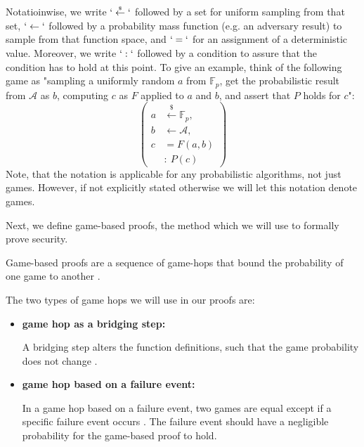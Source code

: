Notatioinwise, we write $`\overset{{\scriptscriptstyle\$}}{\leftarrow}`$ followed by a set for uniform sampling from that set, $`\leftarrow`$ followed by a probability mass function (e.g. an adversary result) to sample from that function space, and $`=`$ for an assignment of a deterministic value. Moreover, we write $`:`$ followed by a condition to assure that the condition has to hold at this point. To give an example, think of the following game as "sampling a uniformly random $a$ from $\mathbb{F}_p$, get the probabilistic result from $\mathcal{A}$ as $b$, computing $c$ as $F$ applied to $a$ and $b$, and assert that $P$ holds for $c$":
\begin{equation*}
    \left(
    \begin{aligned}
        a & \overset{{\scriptscriptstyle\$}}{\leftarrow} \mathbb{F}_p, \\
        b & \leftarrow \mathcal{A}, \\
        c & = F(a,b) \\
        & : \ P(c)
    \end{aligned}
    \right)
\end{equation*}
Note, that the notation is applicable for any probabilistic algorithms, not just games. However, if not explicitly stated otherwise we will let this notation denote games.

Next, we define game-based proofs, the method which we will use to formally prove security.

\begin{definition}
    \label{game-hops-def}
    Game-based proofs are a sequence of game-hops that bound the probability of one game to another \parencite{gamesB&R,shoup_games}.

    The two types of game hops we will use in our proofs are:
    \begin{itemize}
        \item \textbf{game hop as a bridging step:} 
        
        A bridging step alters the function definitions, such that the game probability does not change \parencite{shoup_games}.
        \item \textbf{game hop based on a failure event:}
        
        In a game hop based on a failure event, two games are equal except if a specific failure event occurs \parencite{shoup_games}. The failure event should have a negligible probability for the game-based proof to hold.
    \end{itemize}
\end{definition}

